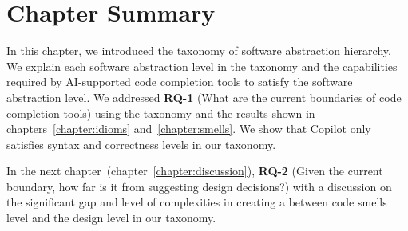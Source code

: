 \section{Chapter Summary}
In this chapter, we introduced the taxonomy of software abstraction hierarchy. We explain each software abstraction level in the taxonomy and the capabilities required by AI-supported code completion tools to satisfy the software abstraction level.
We addressed \textbf{RQ-1} (What are the current boundaries of code completion tools) using the taxonomy and the results shown in chapters~\ref{chapter:idioms} and~\ref{chapter:smells}. We show that Copilot only satisfies syntax and correctness levels in our taxonomy. 

In the next chapter~(chapter~\ref{chapter:discussion}), \textbf{RQ-2} (Given the current boundary, how far is it from suggesting design decisions?) with a discussion on the significant gap and level of complexities in creating a between code smells level and the design level in our taxonomy.